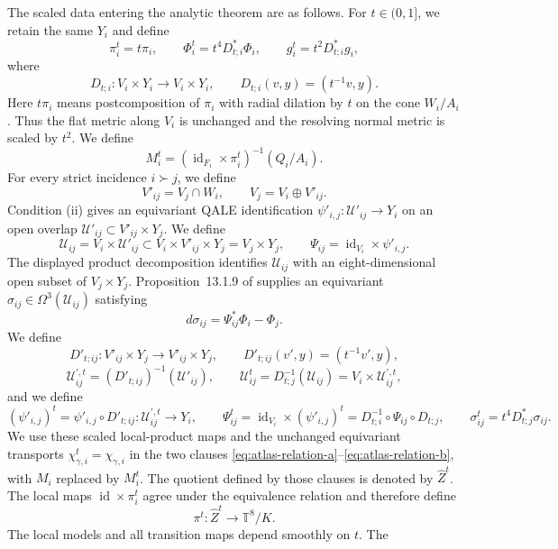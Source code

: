 \documentclass[11pt]{article}
\theoremstyle{remark}\newtheorem{remark}[theorem]{Remark}
\newcommand{\T}{\mathbb T}
\newcommand{\id}{\operatorname{id}}
\begin{document}
The scaled data entering the analytic theorem are as follows.  For
$t\in(0,1]$, we retain the same $Y_i$ and define
\[
 \pi_i^t=t\pi_i,\qquad
 \Phi_i^t=t^4D_{t;i}^*\Phi_i,\qquad
 g_i^t=t^2D_{t;i}^*g_i,
\]
where
\[
 D_{t;i}:V_i\times Y_i\longrightarrow V_i\times Y_i,
 \qquad D_{t;i}(v,y)=(t^{-1}v,y).
\]
Here $t\pi_i$ means postcomposition of $\pi_i$ with radial dilation by
$t$ on the cone $W_i/A_i$.
Thus the flat metric along $V_i$ is unchanged and the resolving normal
metric is scaled by $t^2$.  We define
\[
 M_i^t=(\id_{F_i}\times\pi_i^t)^{-1}(Q_i/A_i).
\]
For every strict incidence $i\succ j$, we define
\[
 V'_{ij}=V_j\cap W_i,\qquad V_j=V_i\oplus V'_{ij}.
\]
Condition (ii) gives an equivariant QALE identification
$\psi'_{i,j}:\mathcal U'_{ij}\to Y_i$ on an open overlap
$\mathcal U'_{ij}\subset V'_{ij}\times Y_j$.  We define
\[
 \mathcal U_{ij}=V_i\times\mathcal U'_{ij}
       \subset V_i\times V'_{ij}\times Y_j=V_j\times Y_j,
 \qquad
 \Psi_{ij}=\id_{V_i}\times\psi'_{i,j}.
\]
The displayed product decomposition identifies $\mathcal U_{ij}$ with an
eight-dimensional open subset of $V_j\times Y_j$.
Proposition~13.1.9 of \cite{JoyceBook} supplies an equivariant
$\sigma_{ij}\in\Omega^3(\mathcal U_{ij})$ satisfying
\begin{equation}\label{eq:unscaled-overlap-primitive}
 d\sigma_{ij}=\Psi_{ij}^*\Phi_i-\Phi_j.
\end{equation}
We define
\[
 D'_{t;ij}:V'_{ij}\times Y_j\longrightarrow V'_{ij}\times Y_j,
 \qquad D'_{t;ij}(v',y)=(t^{-1}v',y),
\]
\[
 \mathcal U_{ij}^{\prime,t}
   =(D'_{t;ij})^{-1}(\mathcal U'_{ij}),\qquad
\mathcal U_{ij}^t=D_{t;j}^{-1}(\mathcal U_{ij})
   =V_i\times\mathcal U_{ij}^{\prime,t},
\]
and we define
\[
 (\psi'_{i,j})^t
   =\psi'_{i,j}\circ D'_{t;ij}:
      \mathcal U_{ij}^{\prime,t}\longrightarrow Y_i,\qquad
 \Psi_{ij}^t=\id_{V_i}\times(\psi'_{i,j})^t
 =D_{t;i}^{-1}\circ\Psi_{ij}\circ D_{t;j},
 \qquad
 \sigma_{ij}^t=t^4D_{t;j}^*\sigma_{ij}.
\]
We use these scaled local-product maps and the unchanged equivariant
transports $\chi^t_{\gamma,i}=\chi_{\gamma,i}$ in the two clauses
\eqref{eq:atlas-relation-a}--\eqref{eq:atlas-relation-b}, with $M_i$
replaced by $M_i^t$.  The quotient defined by those clauses is denoted by
$\widehat Z^t$.  The local maps $\id\times\pi_i^t$ agree under the
equivalence relation and therefore define
\begin{equation}\label{eq:scaled-blowdown}
 \pi^t:\widehat Z^t\longrightarrow\T^8/K.
\end{equation}
The local models and all transition maps depend smoothly on $t$.  The
\end{document}
